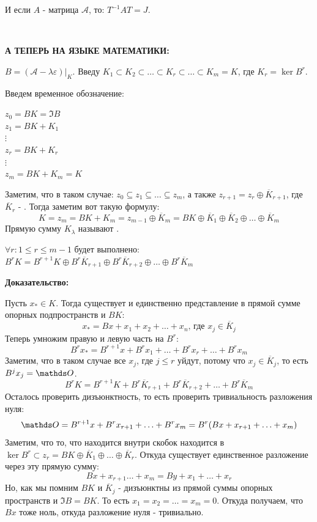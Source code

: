 И если $A$ - матрица $\mathcal{A}$, то: $T^{-1}AT=J$.

\,

\textbf{А ТЕПЕРЬ НА ЯЗЫКЕ МАТЕМАТИКИ:}

$B = (\mathcal{A}-\lambda\varepsilon)\Big|_{K}$. 
Введу $K_1 \subset K_2 \subset \ldots \subset K_r \subset \ldots \subset K_m = K$, где $K_r = \ker B^r$.

Введем временное обозначение:

$z_0 = BK = \Im B$\\
$z_1 = BK + K_1$\\
$\vdots$\\
$z_r = BK + K_r$\\
$\vdots$\\
$z_m = BK + K_m = K$

Заметим, что в таком случае: $z_0 \subseteq z_1 \subseteq \ldots \subseteq z_m $, а также $z_{r+1}= z_r \oplus \overline{K}_{r+1}$, где $\overline{K}_r$ - . Тогда заметим вот такую формулу:
$$K = z_m= BK+K_m  = z_{m-1} \oplus \overline{K}_m = BK \oplus\overline{K}_1 \oplus \overline{K}_2 \oplus \ldots \oplus \overline{K}_m$$ 
Прямую сумму $K_{\lambda}$ называют .


$\forall r: 1\leq r \leq m-1$ будет выполнено: $B^rK = B^{r+1}K \oplus B^r \overline{K}_{r+1}\oplus B^r \overline{K}_{r+2}\oplus\ldots\oplus B^r \overline{K}_m$

\textbf{Доказательство:}

Пусть $x_{*} \in K$. Тогда существует и единственно представление в прямой сумме опорных подпространств и $BK$:
$$x_{*} = Bx + x_1 + x_2 +\ldots +x_n\text{, где }x_j \in \overline{K}_{j}$$
Теперь умножим правую и левую часть на $B^r$:
$$B^r x_*  = B^{r+1}x + B^r x_1 +\ldots + B^r x_r + \ldots + B^r x_m$$
Заметим, что в таком случае все $x_j$, где $j\leq r$ уйдут, потому что $x_j \in \overline{K}_j$, то есть $B^{j}x_j = \zero$.
$$B^rK = B^{r+1}K + B^r \overline{K}_{r+1}+ B^r \overline{K}_{r+2}+\ldots+ B^r \overline{K}_m$$
Осталось проверить дизъюнктность, то есть проверить тривиальность разложения нуля:
$$\zero = B^{r+1}x + B^{r}x_{r+1} + \ldots + B^r x_m = B^r(Bx + x_{r+1} + \ldots +x_m)$$
Заметим, что то, что находится внутри скобок находится в $\ker B^r\subset z_r = BK\oplus \overline{K}_1 \oplus\ldots\oplus \overline{K}_r$. Откуда существует единственное разложение через эту прямую сумму:
$$Bx + x_{r+1}\ldots +x_m = By + x_1 +\ldots + x_r$$
Но, как мы помним $BK$ и $\overline{K}_j$ - дизъюнктны из прямой суммы опорных пространств и $\Im B =BK$.  То есть $x_1=x_2 =\ldots = x_m =0$. Откуда получаем, что $Bx$ тоже ноль, откуда разложение нуля - тривиально.

